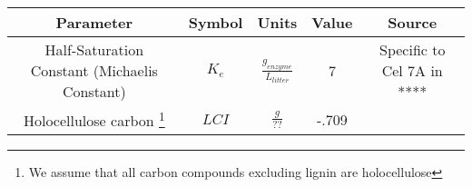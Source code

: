 \documentclass{article}
\begin{document}
\begin{center}
 \begin{tabular}{|c c c c c|} 
 \hline
 Parameter & Symbol & Units & Value & Source \\
 \hline\hline
 Half-Saturation Constant (Michaelis Constant) & $K_e$ & $\frac{g_{enzyme}}{L_{litter}} $ & 7 & \cite{Kari2014} Specific to Cel 7A in **** \\ 
 \hline
 Holocellulose carbon \footnote{We assume that all carbon compounds excluding lignin are holocellulose} & $LCI$ & $\frac{g}{??} $ & -.709 & \cite{Kari2014} \\ [1ex] 
 \hline
\end{tabular}
\end{center}




\end{document}
